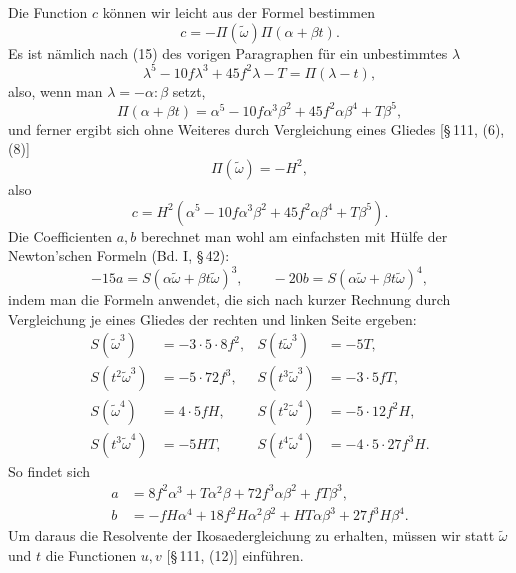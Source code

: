 \documentclass[11pt]{article}
\begin{document}
Die Function \(c\) können wir leicht aus der Formel bestimmen
\[
c=-\Pi(\tilde\omega)\Pi(\alpha+\beta t).
\]
Es ist nämlich nach (15) des vorigen Paragraphen für ein unbestimmtes \(\lambda\)
\[
\lambda^5-10f\lambda^3+45f^2\lambda-T=\Pi(\lambda-t),
\]
also, wenn man \(\lambda=-\alpha:\beta\) setzt,
\[
\Pi(\alpha+\beta t)=\alpha^5-10f\alpha^3\beta^2+45f^2\alpha\beta^4+T\beta^5,
\]
und ferner ergibt sich ohne Weiteres durch Vergleichung eines Gliedes [\S\,111, (6), (8)]
\[
\Pi(\tilde\omega)=-H^2,
\]
also
\begin{equation}
c=H^2(\alpha^5-10f\alpha^3\beta^2+45f^2\alpha\beta^4+T\beta^5).
\tag{3}
\end{equation}
Die Coefficienten \(a,b\) berechnet man wohl am einfachsten mit Hülfe der Newton'schen Formeln (Bd. I, \S\,42):
\[
-15a=S(\alpha\tilde\omega+\beta t\tilde\omega)^3,
\qquad
-20b=S(\alpha\tilde\omega+\beta t\tilde\omega)^4,
\]
indem man die Formeln anwendet, die sich nach kurzer Rechnung durch Vergleichung je eines Gliedes der rechten und linken Seite ergeben:
\[
\begin{array}{rlrl}
S(\tilde\omega^3)&=-3\cdot5\cdot8f^2,&S(t\tilde\omega^3)&=-5T,\\
S(t^2\tilde\omega^3)&=-5\cdot72f^3,&S(t^3\tilde\omega^3)&=-3\cdot5fT,\\
S(\tilde\omega^4)&=4\cdot5fH,&S(t^2\tilde\omega^4)&=-5\cdot12f^2H,\\
S(t^3\tilde\omega^4)&=-5HT,&S(t^4\tilde\omega^4)&=-4\cdot5\cdot27f^3H.
\end{array}
\]
So findet sich
\begin{align}
a&=8f^2\alpha^3+T\alpha^2\beta+72f^3\alpha\beta^2+fT\beta^3,
\tag{4}\\
b&=-fH\alpha^4+18f^2H\alpha^2\beta^2+HT\alpha\beta^3+27f^3H\beta^4.
\tag{5}
\end{align}
Um daraus die Resolvente der Ikosaedergleichung zu erhalten, müssen wir statt \(\tilde\omega\) und \(t\) die Functionen \(u,v\) [\S\,111, (12)] einführen.
\end{document}
